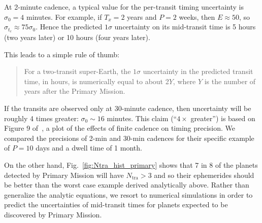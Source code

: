 At 2-minute cadence, a typical value for the per-transit timing uncertainty is 
$\sigma_0 = 4$ minutes.
For example, if $T_x = 2$ years and $P = 2$ weeks, then $E \approx 50$, so 
$\sigma_{t_c}\approx 75\sigma_0$.
Hence the predicted $1\sigma$ uncertainty on its mid-transit time 
is 5 hours (two years later) or 10 hours (four years later).
 
 This leads to a simple rule of thumb: %
\begin{quotation}
  For a two-transit super-Earth, the $1\sigma$ uncertainty in the predicted 
  transit time, in hours, is numerically equal to about
  2$Y$, where $Y$ is the number of years after the Primary Mission.
\end{quotation}
If the transits are observed only at 30-minute cadence, then uncertainty will be roughly 4 times greater: $\sigma_0 \sim 16$ minutes. 
This claim (``$4\times$ greater'') is based on Figure 9 of~\citep{price_transit_2014}, a plot of the effects of finite cadence on timing precision. %
We compared the precisions of 2-min and 30-min cadences for their specific example of $P=10$ days and a dwell time of 1 month.

On the other hand, Fig.~\ref{fig:Ntra_hist_primary} shows that 7 in 8 of the 
planets detected by \tesss Primary Mission will have $N_\mathrm{tra}>3$ and so 
their ephemerides should be better than the worst case example derived 
analytically above.
Rather than generalize the analytic equations, we resort to numerical simulations in order to predict the uncertainties of mid-transit times for planets expected to be discovered by \tesss Primary Mission.

